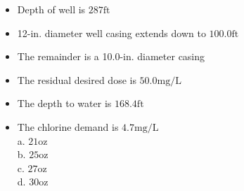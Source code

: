 \documentclass[10pt]{article}
\begin{document}
\begin{itemize}
  \item Depth of well is $287 \mathrm{ft}$

  \item 12-in. diameter well casing extends down to $100.0 \mathrm{ft}$

  \item The remainder is a 10.0-in. diameter casing

  \item The residual desired dose is $50.0 \mathrm{mg} / \mathrm{L}$

  \item The depth to water is $168.4 \mathrm{ft}$

  \item The chlorine demand is $4.7 \mathrm{mg} / \mathrm{L}$\\
a. $21 \mathrm{oz}$\\
b. $25 \mathrm{oz}$\\
c. $27 \mathrm{oz}$\\
d. $30 \mathrm{oz}$

\end{itemize}
\end{document}
